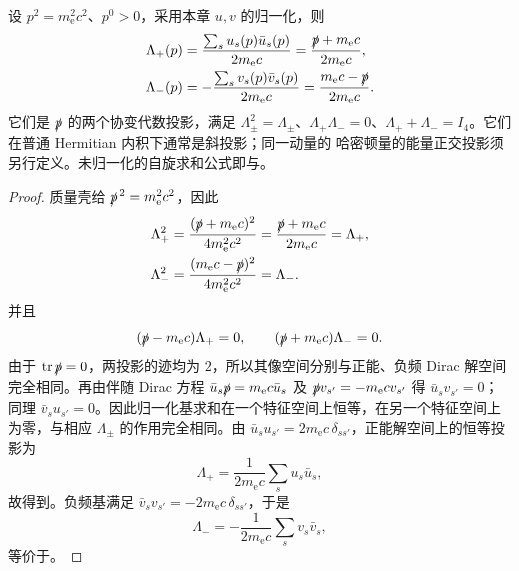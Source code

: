 \begin{proposition}[自由旋量的完备关系]
设 $p^2=m_{\mathrm e}^2c^2$、$p^0>0$，采用本章 $u,v$ 的归一化，则
\begin{align*}
\Lambda_+(p)&=\frac{\sum_su_s(p)\bar u_s(p)}{2m_{\mathrm e}c}
=\frac{\slashed p+m_{\mathrm e}c}{2m_{\mathrm e}c},\\
\Lambda_-(p)&=-\frac{\sum_sv_s(p)\bar v_s(p)}{2m_{\mathrm e}c}
=\frac{m_{\mathrm e}c-\slashed p}{2m_{\mathrm e}c}.
\end{align*}
它们是 $\slashed p$ 的两个协变代数投影，满足 $\Lambda_\pm^2=\Lambda_\pm$、$\Lambda_+\Lambda_-=0$、$\Lambda_++\Lambda_-=I_4$。它们在普通 Hermitian 内积下通常是斜投影；同一动量的 哈密顿量的能量正交投影须另行定义。未归一化的自旋求和公式即与。
\end{proposition}
\begin{proof}
质量壳给 $\slashed p^{\,2}=m_{\mathrm e}^2c^2$，因此
\begin{align*}
\Lambda_+^2
&=\frac{(\slashed p+m_{\mathrm e} c)^2}{4m_{\mathrm e}^2c^2}
=\frac{\slashed p+m_{\mathrm e} c}{2m_{\mathrm e} c}=\Lambda_+,\\
\Lambda_-^2
&=\frac{(m_{\mathrm e} c-\slashed p)^2}{4m_{\mathrm e}^2c^2}
=\Lambda_-.
\end{align*}
并且
\begin{equation*}
(\slashed p-m_{\mathrm e} c)\Lambda_+=0,
\qquad
(\slashed p+m_{\mathrm e} c)\Lambda_-=0.
\end{equation*}
由于 $\operatorname{tr}\slashed p=0$，两投影的迹均为 $2$，所以其像空间分别与正能、负频 Dirac 解空间完全相同。再由伴随 Dirac 方程 $\bar u_s\slashed p=m_{\mathrm e}c\bar u_s$ 及 $\slashed p v_{s'}=-m_{\mathrm e}cv_{s'}$ 得 $\bar u_sv_{s'}=0$；同理 $\bar v_su_{s'}=0$。因此归一化基求和在一个特征空间上恒等，在另一个特征空间上为零，与相应 $\Lambda_\pm$ 的作用完全相同。由 $\bar u_su_{s'}=2m_{\mathrm e} c\,\delta_{ss'}$，正能解空间上的恒等投影为
\begin{equation*}
\Lambda_+=\frac1{2m_{\mathrm e} c}\sum_su_s\bar u_s,
\end{equation*}
故得到。负频基满足 $\bar v_sv_{s'}=-2m_{\mathrm e} c\,\delta_{ss'}$，于是
\begin{equation*}
\Lambda_-=-\frac1{2m_{\mathrm e} c}\sum_sv_s\bar v_s,
\end{equation*}
等价于。
\end{proof}

